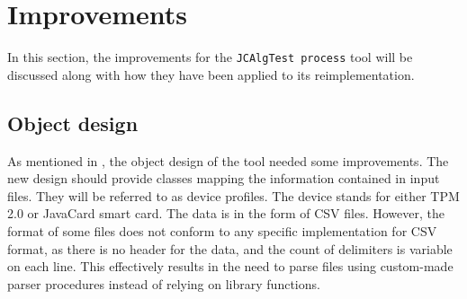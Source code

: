 \section{Improvements}
In this section, the improvements for the \texttt{JCAlgTest process} tool will be discussed along with how they have been applied to its reimplementation.

\subsection{Object design}
As mentioned in , the object design of the tool needed some improvements. The new design should provide classes mapping the information contained in input files. They will be referred to as device profiles. The device stands for either TPM 2.0 or JavaCard smart card. The data is in the form of CSV files. However, the format of some files does not conform to any specific implementation for CSV format, as there is no header for the data, and the count of delimiters is variable on each line. This effectively results in the need to parse files using custom-made parser procedures instead of relying on library functions.

